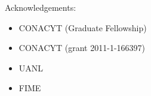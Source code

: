 
\begin{frame}
  
Acknowledgements:
\begin{itemize}
\item CONACYT (Graduate Fellowship)
\item CONACYT (grant 2011-1-166397)
\item UANL
\item FIME
\end{itemize}

\end{frame}
